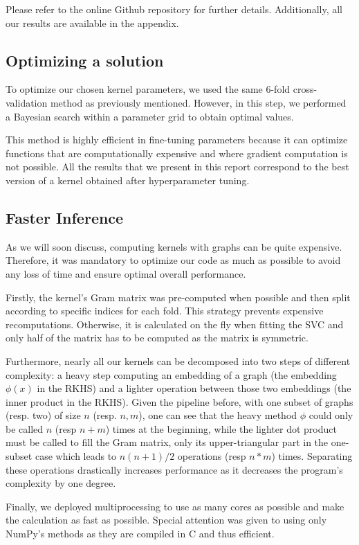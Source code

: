 \documentclass{IEEEtran}
\begin{document}
Please refer to the online Github repository for further details.
Additionally, all our results are available in the appendix.

\subsection{Optimizing a solution}
To optimize our chosen kernel parameters, we used the same 6-fold cross-validation method as previously mentioned. However, in this step, we performed a Bayesian search within a parameter grid to obtain optimal values.

This method is highly efficient in fine-tuning parameters because it can optimize functions that are computationally expensive and where gradient computation is not possible. All the results that we present in this report correspond to the best version of a kernel obtained after hyperparameter tuning.

\subsection{Faster Inference}
As we will soon discuss, computing kernels with graphs can be quite expensive. Therefore, it was mandatory to optimize our code as much as possible to avoid any loss of time and ensure optimal overall performance.

Firstly, the kernel's Gram matrix was pre-computed when possible and then split according to specific indices for each fold. This strategy prevents expensive recomputations. Otherwise, it is calculated on the fly when fitting the SVC and only half of the matrix has to be computed as the matrix is symmetric.

Furthermore, nearly all our kernels can be decomposed into two steps of different complexity: a heavy step computing an embedding of a graph (the embedding $\phi(x)$ in the RKHS) and a lighter operation between those two embeddings (the inner product in the RKHS). Given the pipeline before, with one subset of graphs (resp. two) of size $n$ (resp. $n,m$), one can see that the heavy method $\phi$ could only be called $n$ (resp $n+m$) times at the beginning, while the lighter dot product must be called to fill the Gram matrix, only its upper-triangular part in the one-subset case which leads to $n(n+1)/2$ operations (resp $n*m$) times. Separating these operations drastically increases performance as it decreases the program's complexity by one degree.

Finally, we deployed multiprocessing to use as many cores as possible and make the calculation as fast as possible. Special attention was given to using only NumPy's methods as they are compiled in C and thus efficient.
\end{document}
